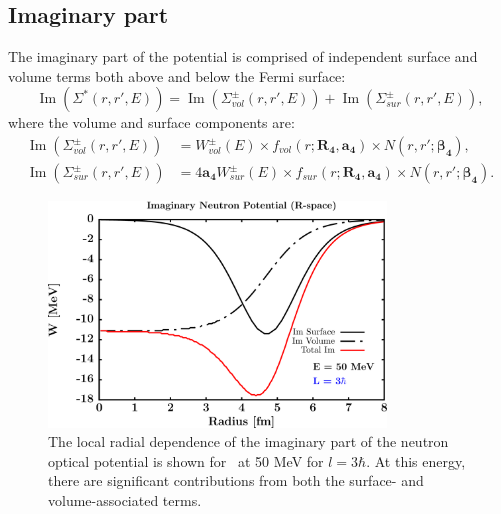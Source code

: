 \subsection{Imaginary part}
The imaginary part of the potential is comprised of independent surface and volume terms
both above and below the Fermi surface:
\begin{equation}
    \operatorname{Im}({\Sigma^{*}(r,r',E)}) =
    \operatorname{Im}({\Sigma_{vol}^{\pm}(r,r',E)})
    + \operatorname{Im}({\Sigma_{sur}^{\pm}(r,r',E)}),
\end{equation}
where the volume and surface components are:
\begin{equation}
    \begin{split}
        \operatorname{Im}({\Sigma_{vol}^{\pm}(r,r',E)})
        & = W_{vol}^{\pm}(E){\times}f_{vol}(r; \bm{R_{4}}, \bm{a_{4}})
        {\times}N(r,r'; \bm{\beta_{4}}),\\
        \operatorname{Im}({\Sigma_{sur}^{\pm}(r,r',E)})
        & = 4\bm{a_{4}}W_{sur}^{\pm}(E){\times}f_{sur}(r; \bm{R_{4}}, \bm{a_{4}})
        {\times} N(r,r';\bm{\beta_{4}}).
    \end{split}
\end{equation}
\begin{figure}[tb]
    \centering
    \includegraphics[width=0.8\textwidth]{figures/ImPotentialRSpace.png}
    \caption[Radial dependence of the imaginary part of the potential]
    {
        The local radial dependence of the imaginary part of the neutron optical potential is shown
        for \niEight\ at 50 MeV for $l=3\hbar$. At this energy, there are
        significant contributions from both the surface- and volume-associated
        terms.
    }
    \label{ImaginaryRadialDependence}
\end{figure}
